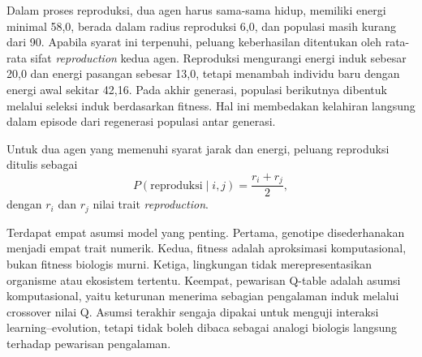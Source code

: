 \documentclass[10pt]{article}
\begin{document}
Dalam proses reproduksi, dua agen harus sama-sama hidup, memiliki energi minimal 58,0, berada dalam radius reproduksi 6,0, dan populasi masih kurang dari 90. Apabila syarat ini terpenuhi, peluang keberhasilan ditentukan oleh rata-rata sifat \textit{reproduction} kedua agen. Reproduksi mengurangi energi induk sebesar 20,0 dan energi pasangan sebesar 13,0, tetapi menambah individu baru dengan energi awal sekitar 42,16. Pada akhir generasi, populasi berikutnya dibentuk melalui seleksi induk berdasarkan fitness. Hal ini membedakan kelahiran langsung dalam episode dari regenerasi populasi antar generasi.

Untuk dua agen yang memenuhi syarat jarak dan energi, peluang reproduksi ditulis sebagai
\[
P(\mathrm{reproduksi}\mid i,j)=\frac{r_i+r_j}{2},
\]
dengan $r_i$ dan $r_j$ nilai trait \textit{reproduction}.

Terdapat empat asumsi model yang penting. Pertama, genotipe disederhanakan menjadi empat trait numerik. Kedua, fitness adalah aproksimasi komputasional, bukan fitness biologis murni. Ketiga, lingkungan tidak merepresentasikan organisme atau ekosistem tertentu. Keempat, pewarisan Q-table adalah asumsi komputasional, yaitu keturunan menerima sebagian pengalaman induk melalui crossover nilai Q. Asumsi terakhir sengaja dipakai untuk menguji interaksi learning--evolution, tetapi tidak boleh dibaca sebagai analogi biologis langsung terhadap pewarisan pengalaman.
\end{document}
